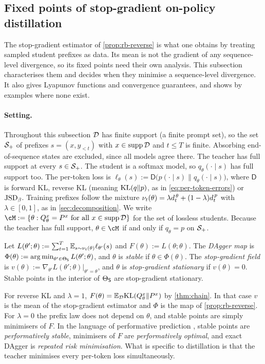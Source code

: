 \subsection{Fixed points of stop-gradient on-policy distillation}\label{sec:fixed-points}

The stop-gradient estimator of \cref{prop:rb-reverse} is what one obtains by treating sampled student prefixes as
data. Its mean is not the gradient of any sequence-level divergence, so its fixed points need their own
analysis. This subsection characterises them and decides when they minimise a sequence-level divergence. It
also gives Lyapunov functions and convergence guarantees, and shows by examples where none exist.

\paragraph{Setting.} Throughout this subsection $\mathcal{D}$ has finite support (a finite prompt set), so the set $\mathcal{S}_+$ of
prefixes $s=(x,y_{<t})$ with $x\in\operatorname{supp}\mathcal{D}$ and $t\le T$ is finite. Absorbing end-of-sequence states are
excluded, since all models agree there. The teacher has full support at every $s\in\mathcal{S}_+$. The student is a softmax model, so
$q_\theta(\cdot\mid s)$ has full support too. The per-token loss is $\ell_\theta(s):=\mathsf D\big(p(\cdot\mid s)\|q_\theta(\cdot\mid s)\big)$, where
$\mathsf D$ is forward KL, reverse KL (meaning $\mathrm{KL}(q\|p)$, as in \eqref{eq:per-token-errors}) or $\mathrm{JSD}_\beta$. Training prefixes follow
the mixture $\nu_t(\theta)=\lambda d^{\,\theta}_{t}+(1-\lambda)d^{\,p}_{t}$ with $\lambda\in[0,1]$, as in \cref{sec:decomposition}. We write
$\cM:=\{\theta:\Qseq=\Pseq\text{ for all }x\in\operatorname{supp}\cD\}$ for the set of lossless students. Because the teacher has full
support, $\theta\in\cM$ if and only if $q_\theta=p$ on $\mathcal{S}_+$.

\begin{definition}\label{def:dagger}
Let $L(\theta';\theta):=\sum_{t=1}^T\mathbb{E}_{s\sim\nu_t(\theta)}\ell_{\theta'}(s)$ and $F(\theta):=L(\theta;\theta)$. The \emph{DAgger map} is
$\Phi(\theta):=\operatorname*{arg\,min}_{\theta'\in\Theta_{\mathsf{S}}}L(\theta';\theta)$, and $\theta$ is \emph{stable} if $\theta\in\Phi(\theta)$. The \emph{stop-gradient field} is
$v(\theta):=\nabla_{\theta'}L(\theta';\theta)|_{\theta'=\theta}$, and $\theta$ is \emph{stop-gradient stationary} if $v(\theta)=0$. Stable points in the
interior of $\Theta_{\mathsf{S}}$ are stop-gradient stationary.
\end{definition}
\noindent
For reverse KL and $\lambda=1$, $F(\theta)=\mathbb{E}_{\mathcal{D}}\mathrm{KL}(Q^{x}_{\theta}\|P^{x})$ by \cref{thm:chain}. In that case $v$ is the mean of the
stop-gradient estimator and $\Phi$ is the map of \cref{prop:rb-reverse}. For $\lambda=0$ the prefix law does not depend on $\theta$,
and stable points are simply minimisers of $F$. In the language of performative prediction
\citep{perdomo2020performative}, stable points are \emph{performatively stable}, minimisers of $F$ are \emph{performatively
optimal}, and exact DAgger is \emph{repeated risk minimisation}. What is specific to distillation is that the teacher
minimises every per-token loss simultaneously.

